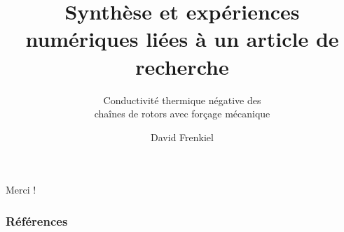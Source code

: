 \documentclass{beamer}
\title{Synthèse et expériences numériques liées à un article de recherche}
\subtitle{Conductivité thermique négative des \\ chaînes de rotors avec forçage mécanique}
\author[dfrenkiel]{David Frenkiel}
\institute{Cours 5MM50 \\ Sorbonne Université}
\begin{document}
    

    

    
    
    
    

    \begin{frame}
        \center \Huge Merci !
    \end{frame}

    \begin{frame}[allowframebreaks]

        \frametitle{Références}

        \renewcommand*{\bibfont}{\scriptsize}
        \nocite{*}
        \printbibliography[title=All]

    \end{frame}
\end{document}
